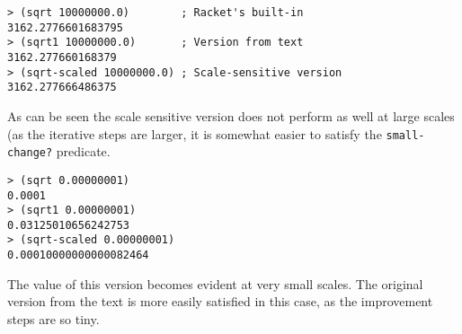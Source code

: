 \documentclass[11pt]{article}
\begin{document}
\begin{enumerate}
\begin{verbatim}
> (sqrt 10000000.0)        ; Racket's built-in
3162.2776601683795
> (sqrt1 10000000.0)       ; Version from text
3162.277660168379
> (sqrt-scaled 10000000.0) ; Scale-sensitive version
3162.277666486375
\end{verbatim}

As can be seen the scale sensitive version does not perform as well at
large scales (as the iterative steps are larger, it is somewhat easier
to satisfy the \texttt{small-change?} predicate.

\begin{verbatim}
> (sqrt 0.00000001)
0.0001
> (sqrt1 0.00000001)
0.03125010656242753
> (sqrt-scaled 0.00000001)
0.00010000000000082464
\end{verbatim}

The value of this version becomes evident at very small scales.  The
original version from the text is more easily satisfied in this case,
as the improvement steps are so tiny.
\end{enumerate}
\end{document}
